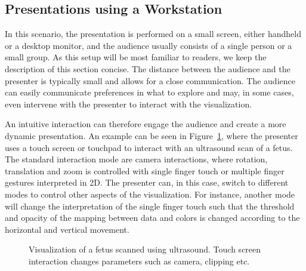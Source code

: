 \documentclass[journal]{vgtc}                %
\begin{document}
%
%
\subsection{Presentations using a Workstation} \label{sec:workstation}
In this scenario, the presentation is performed on a small screen, either handheld or a desktop monitor, and the audience usually consists of a single person or a small group.
As this setup will be most familiar to readers, we keep the description of this section concise.
The distance between the audience and the presenter is typically small and allows for a close communication.
The audience can easily communicate preferences in what to explore and may, in some cases, even intervene with the presenter to interact with the visualization.

An intuitive interaction can therefore engage the audience and create a more dynamic presentation.
An example can be seen in Figure~\ref{img:touch_workstation}, where the presenter uses a touch screen or touchpad to interact with an ultrasound scan of a fetus.
The standard interaction mode are camera interactions, where rotation, translation and zoom is controlled with single finger touch or multiple finger gestures interpreted in 2D.
The presenter can, in this case, switch to different modes to control other aspects of the visualization. For instance, another mode will change the interpretation of the single finger touch such that the threshold and opacity of the mapping between data and colors is changed according to the horizontal and vertical movement.

%
%
%
%

\begin{figure}
	\centering
	\caption{Visualization of a fetus scanned using ultrasound. Touch screen interaction changes parameters such as camera, clipping etc.}
	\label{img:touch_workstation}
\end{figure}
\end{document}
